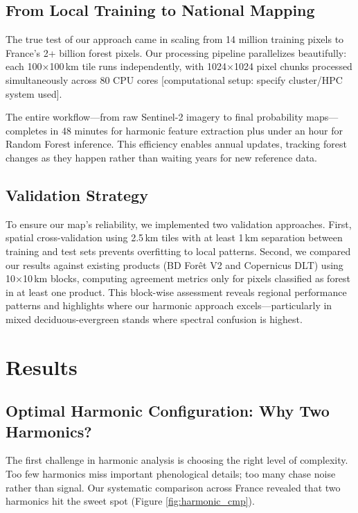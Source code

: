 \documentclass[utf8]{FrontiersinHarvard}
\begin{document}
\subsection{From Local Training to National Mapping}

The true test of our approach came in scaling from 14 million training pixels to France's 2+ billion forest pixels. Our processing pipeline parallelizes beautifully: each 100×100\,km tile runs independently, with 1024×1024 pixel chunks processed simultaneously across 80 CPU cores [computational setup: specify cluster/HPC system used].

The entire workflow—from raw Sentinel-2 imagery to final probability maps—completes in 48 minutes for harmonic feature extraction plus under an hour for Random Forest inference. This efficiency enables annual updates, tracking forest changes as they happen rather than waiting years for new reference data.

\subsection{Validation Strategy}

To ensure our map's reliability, we implemented two validation approaches. First, spatial cross-validation using 2.5\,km tiles with at least 1\,km separation between training and test sets prevents overfitting to local patterns. Second, we compared our results against existing products (BD Forêt V2 and Copernicus DLT) using 10×10\,km blocks, computing agreement metrics only for pixels classified as forest in at least one product. This block-wise assessment reveals regional performance patterns and highlights where our harmonic approach excels—particularly in mixed deciduous-evergreen stands where spectral confusion is highest.

\section{Results}

\subsection{Optimal Harmonic Configuration: Why Two Harmonics?}

The first challenge in harmonic analysis is choosing the right level of complexity. Too few harmonics miss important phenological details; too many chase noise rather than signal. Our systematic comparison across France revealed that two harmonics hit the sweet spot (Figure \ref{fig:harmonic_cmp}).
\end{document}
